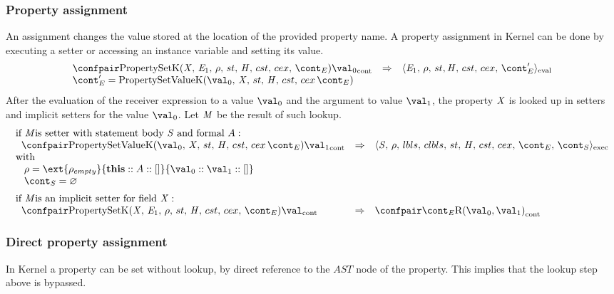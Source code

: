 \documentclass{article}
\renewcommand{\emptyset}{\varnothing}
\begin{document}
\subsubsection{Property assignment}
\label{subsubsec:property-assignment}
An assignment changes the value stored at the location of the provided property name.
A property assignment in Kernel can be done by executing a setter or accessing an instance variable and setting its value.
\[
  \begin{array}{lcl}
	\cesktrans{
		\contconf{\PropertySetK}{\val_0}}{
		\evalconf{\expressionmeta_1}{\env}{\strace}{\cstrace}{\cex}{\econt'}}\\
	\econt' = \PropertySetVK
  \end{array}
\]
\noindent
After the evaluation of the receiver expression to a value $\val_0$ and the argument to value $\val_1$, the property $\mathit{X}$ is looked up in setters and implicit setters for the value $\val_0$.
Let $\mathit{M}$ be the result of such lookup.
\[
  \begin{array}{lcl}
	\textrm{if \membermeta is setter with statement body }\stmt \textrm{ and formal }\formal :\\
	\hspace{2mm}
	\cesktrans{
		\contconf{\PropertySetVK}{\val_1}}{
		\execconf{\stmt}{\env}{\lbls}{\clbls}{\handler}{\cstrace}{\cex}{\econt}{\scont}}\\
	\textrm{with}\\
	\hspace{3mm}
	\env = \ext{\env_{empty}}{\mathbf{this} :: \formal :: []}{\val_0 :: \val_1 :: []}\\
	\hspace{3mm}
	\scont = \emptyset\\[2mm]

	\textrm{if \membermeta is an implicit setter for field }\idmeta :\\
	\hspace{2mm}
	\cesktrans{
		\contconf{\PropertySetK}{\val}}{
		\contconf{\econt}{\textrm{R}(\val_0, \val_1)}}
  \end{array}
\]

\subsubsection{Direct property assignment}
\label{subsubsec:direct-property-assignment}
In Kernel a property can be set without lookup, by direct reference to the $AST$ node of the property.
This implies that the lookup step above is bypassed.
\end{document}
